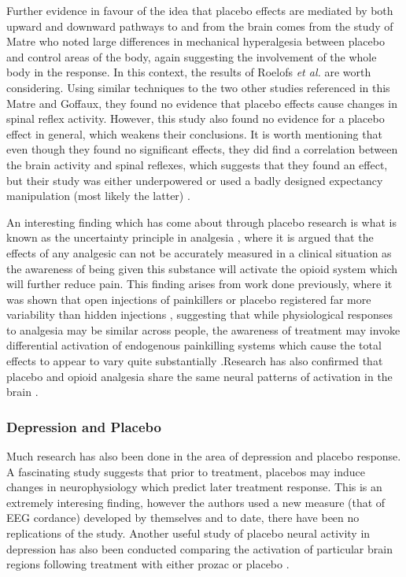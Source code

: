 Further evidence in favour of the idea that placebo effects are mediated by both upward and downward pathways to and from the brain comes from the study of Matre \cite{Matre2006a} who noted large differences in mechanical hyperalgesia between placebo and control areas of the body, again suggesting the involvement of the whole body in the response. In this context, the results of Roelofs \textit{et al.} \cite{Roelofs2000} are worth considering. Using similar techniques to the two other studies referenced in this Matre and Goffaux, they found no evidence that placebo effects cause changes in spinal reflex activity. However, this study also found no evidence for a placebo effect in general, which weakens their conclusions. It is worth mentioning that even though they found no significant effects, they did find a correlation between the brain activity and spinal reflexes, which suggests that they found an effect, but their study was either underpowered or used a badly designed expectancy manipulation (most likely the latter) \cite{Goffaux2007}.

An interesting finding which has come about through placebo research is what is known as the uncertainty principle in analgesia \cite{Colloca2005} , where it is argued that the effects of any analgesic can not be accurately measured in a clinical situation as the awareness of being given this substance will activate the opioid system which will further reduce pain. This finding arises from work done previously, where it was shown that open injections of painkillers or placebo registered far more variability than hidden injections \cite{Benedetti2003c}, suggesting that while physiological responses to analgesia may be similar across people, the awareness of treatment may invoke differential activation of endogenous painkilling systems which cause the total effects to appear to vary quite substantially \cite{Amanzio2001} .Research has also confirmed that placebo and opioid analgesia share the same neural patterns of activation in the brain \cite{Petrovic2005}.

\subsubsection{Depression and Placebo}
\label{sec:depression-placebo}

Much research  has also been done in the area of depression and placebo response.  A fascinating study \cite{Hunter2006}  suggests that prior to treatment, placebos may induce changes in neurophysiology which predict later treatment response. This is an extremely interesing finding, however the authors used a new measure (that of EEG cordance) developed by themselves and to date, there have been no replications of the study. Another useful study of placebo neural activity in depression has also been conducted comparing the activation of particular brain regions following treatment with either prozac or placebo \cite{Mayberg2002}.

